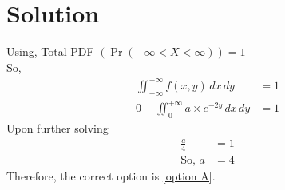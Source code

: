 \documentclass[journal,12pt,twocolumn]{IEEEtran}
\providecommand{\pr}[1]{\ensuremath{\Pr\left(#1\right)}}
\begin{document}
\section*{Solution}
Using, Total PDF $(\pr{-\infty < X < \infty})=1$  \\
So,
\begin{align}
\iint_{-\infty}^{+\infty}  f(x,y) \,dx\,dy &= 1 \\
 0 + \iint_{0}^{+\infty} a \times e^{-2y} \,dx\,dy  &= 1 
\end{align}
Upon further solving
\begin{align}
\frac{a}{4} &= 1 \\
\text{So,  } a &= 4
\end{align}
 Therefore, the correct option is \ref{option A}.  

\end{document}
